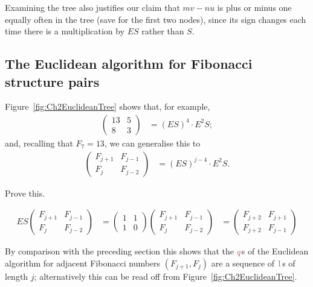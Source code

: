  Examining the tree also justifies our claim that $m v-nu$ is plus or minus one equally often in the tree (save for the first two nodes), since its sign changes each time there is a multiplication by $ES$ rather than $S$.


\subsection{The Euclidean algorithm for Fibonacci structure pairs}
\label{sec:euclidean}
Figure~\ref{fig:Ch2EuclideanTree} shows that, for example,
\begin{align*}
	\begin{pmatrix} 
	13 & 5 
		\\
		8 & 3
	\end{pmatrix} &= 	(E S)^{{4}} \cdot E^2 S ;
\end{align*}
and, recalling that $F_{7}=13$, we can generalise this to
\begin{align}
	\begin{pmatrix} 
		F_{j+1} & F_{j-1} 
		\\
		F _j & F_{j-2}
	\end{pmatrix} &= 	(E S)^{{j-4}} \cdot E^2 S.
\label{eq:FibonacciMatrix}
\end{align}

\begin{jExercise}
	Prove this.
\end{jExercise}
\begin{jAnswer}  
\begin{align}
E S \begin{pmatrix} 	F_{j+1} & F_{j-1} 	\\	F _j & F_{j-2}\end{pmatrix}
  &= 	\begin{pmatrix} 1 & 1\\1 & 0 \end{pmatrix}
\begin{pmatrix} F_{j+1} & F_{j-1} \\F _j & F_{j-2}\end{pmatrix}
&= 
\begin{pmatrix} 	F_{j+2} & F_{j+1} 	\\	F _{j+2} & F_{j-1}
\end{pmatrix}
\end{align}
\end{jAnswer}
By comparison with the preceding section this shows that the $\jq$s of the Euclidean algorithm for adjacent Fibonacci numbers $(F_{j+1},F_j)$ are a sequence of $\jqn{1}$s of length $j$; alternatively this can be read off from Figure~\ref{fig:Ch2EuclideanTree}.

